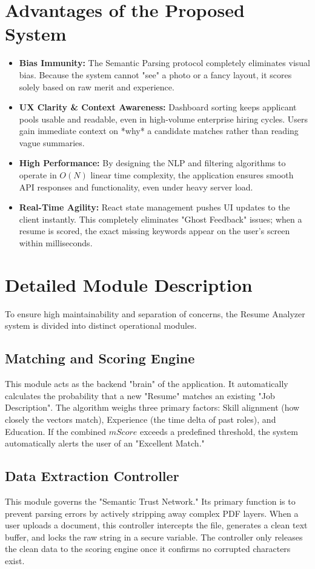 \documentclass[12pt,a4paper]{report}
\begin{document}
\section{Advantages of the Proposed System}

\begin{itemize}
\item \textbf{Bias Immunity:} The Semantic Parsing protocol completely eliminates visual bias. Because the system cannot "see" a photo or a fancy layout, it scores solely based on raw merit and experience.
\item \textbf{UX Clarity \& Context Awareness:} Dashboard sorting keeps applicant pools usable and readable, even in high-volume enterprise hiring cycles. Users gain immediate context on *why* a candidate matches rather than reading vague summaries.
\item \textbf{High Performance:} By designing the NLP and filtering algorithms to operate in $O(N)$ linear time complexity, the application ensures smooth API responses and functionality, even under heavy server load.
\item \textbf{Real-Time Agility:} React state management pushes UI updates to the client instantly. This completely eliminates "Ghost Feedback" issues; when a resume is scored, the exact missing keywords appear on the user's screen within milliseconds.
\end{itemize}

\section{Detailed Module Description}

To ensure high maintainability and separation of concerns, the Resume Analyzer system is divided into distinct operational modules.

\subsection{Matching and Scoring Engine}
This module acts as the backend "brain" of the application. It automatically calculates the probability that a new "Resume" matches an existing "Job Description". The algorithm weighs three primary factors: Skill alignment (how closely the vectors match), Experience (the time delta of past roles), and Education. If the combined $mScore$ exceeds a predefined threshold, the system automatically alerts the user of an "Excellent Match."

\subsection{Data Extraction Controller}
This module governs the "Semantic Trust Network." Its primary function is to prevent parsing errors by actively stripping away complex PDF layers. When a user uploads a document, this controller intercepts the file, generates a clean text buffer, and locks the raw string in a secure variable. The controller only releases the clean data to the scoring engine once it confirms no corrupted characters exist.
\end{document}
